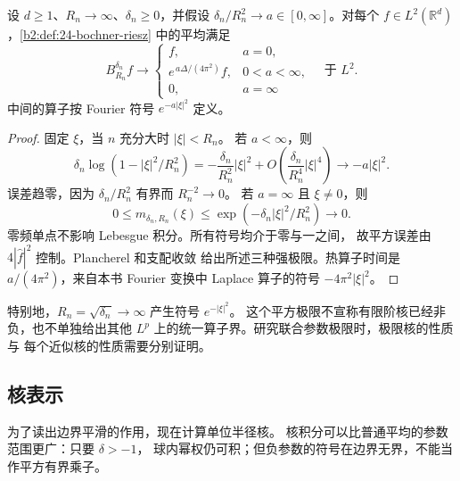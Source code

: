 \begin{proposition}[阶数与半径的联合平方极限]\label{b2:prop:24-heat-limit}
设 \(d\geq1\)、\(R_n\to\infty\)、\(\delta_n\geq0\)，并假设
\(\delta_n/R_n^2\to a\in[0,\infty]\)。对每个
\(f\in L^2(\mathbb R^d)\)，\cref{b2:def:24-bochner-riesz}
中的平均满足
\[
 B_{R_n}^{\delta_n}f\longrightarrow
 \begin{cases}
 f,&a=0,\\
 e^{\,a\Delta/(4\pi^2)}f,&0<a<\infty,\\
 0,&a=\infty
 \end{cases}
 \quad\text{于 }L^2.
\]
中间的算子按 Fourier 符号 \(e^{-a|\xi|^2}\) 定义。
\end{proposition}
\begin{proof}
固定 \(\xi\)，当 \(n\) 充分大时 \(|\xi|<R_n\)。
若 \(a<\infty\)，则
\[
 \delta_n\log(1-|\xi|^2/R_n^2)
 =-\frac{\delta_n}{R_n^2}|\xi|^2
       +O\!\left(\frac{\delta_n}{R_n^4}|\xi|^4\right)
       \longrightarrow-a|\xi|^2.
\]
误差趋零，因为 \(\delta_n/R_n^2\) 有界而 \(R_n^{-2}\to0\)。
若 \(a=\infty\) 且 \(\xi\neq0\)，则
\[
 0\leq m_{\delta_n,R_n}(\xi)
       \leq\exp(-\delta_n|\xi|^2/R_n^2)\longrightarrow0.
\]
零频单点不影响 Lebesgue 积分。所有符号均介于零与一之间，
故平方误差由 \(4|\widehat f|^2\) 控制。Plancherel 和支配收敛
给出所述三种强极限。热算子时间是 \(a/(4\pi^2)\)，来自本书
Fourier 变换中 Laplace 算子的符号 \(-4\pi^2|\xi|^2\)。
\end{proof}

特别地，\(R_n=\sqrt{\delta_n}\to\infty\) 产生符号 \(e^{-|\xi|^2}\)。
这个平方极限不宣称有限阶核已经非负，也不单独给出其他
\(L^p\) 上的统一算子界。研究联合参数极限时，极限核的性质与
每个近似核的性质需要分别证明。

\subsection{核表示}
\label{b2:subsec:240103}

为了读出边界平滑的作用，现在计算单位半径核。
核积分可以比普通平均的参数范围更广：只要 \(\delta>-1\)，
球内幂权仍可积；但负参数的符号在边界无界，不能当作平方有界乘子。

